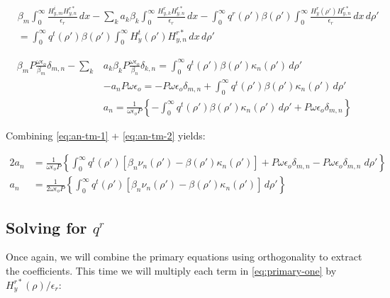 \documentclass[11pt, oneside]{article}   	%
\begin{document}
\begin{align}
&\beta_{m}\int_{0}^{\infty} \frac{H_{y,m}^{i} H_{y,n}^{r*}}{\epsilon_{r}} \, dx
- \sum_{k} a_{k} \beta_{k} \int_{0}^{\infty}  \frac{H_{y,k}^{r} H_{y,n}^{r*}}{\epsilon_{r}}\, dx 
- \int_{0}^{\infty} q^{r} (\rho ') \beta(\rho ')\int_{0}^{\infty} \frac{H_{y}^{r} (\rho ') H_{y,n}^{r*}}{\epsilon_{r}} \, dx \, d\rho ' \nonumber \\
&= \int_{0}^{\infty} q^{t} (\rho ') \beta(\rho ')\int_{0}^{\infty} H_{y}^{t} (\rho ') H_{y,n}^{r*} \, dx \, d\rho '
\end{align}

\begin{align}
\beta_{m} P \frac{\omega \epsilon_{o}}{\beta_{m}}\delta_{m,n} - \sum_{k} &a_{k} \beta_{k} P \frac{\omega \epsilon_{o}}{\beta_{n}}\delta_{k,n}
= \int_{0}^{\infty} q^{t} (\rho ') \beta(\rho ') \kappa_{n}(\rho ') \, d\rho ' \nonumber \\
&-a_{n} P \omega \epsilon_{o}
= -P \omega \epsilon_{o}\delta_{m,n} + \int_{0}^{\infty} q^{t} (\rho ') \beta(\rho ') \kappa_{n}(\rho ') \, d\rho ' \nonumber \\
&a_{n} = \frac{1}{\omega \epsilon_{o} P} \left\{-\int_{0}^{\infty} q^{t} (\rho ') \beta(\rho ')\kappa_{n}(\rho ') \, d\rho ' +P \omega \epsilon_{o}\delta_{m,n} \right\}
\label{eq:an-tm-2}
\end{align}

Combining \eqref{eq:an-tm-1} + \eqref{eq:an-tm-2} yields:

\begin{align}
2 a_{n} &= \frac{1}{\omega \epsilon_{o} P} \left\{\int_{0}^{\infty} q^{t} (\rho ') [\beta_{n}\nu_{n}(\rho ') - \beta(\rho ')\kappa_{n}(\rho ')] +P \omega \epsilon_{o}\delta_{m,n} - P \omega \epsilon_{o}\delta_{m,n} \; d\rho ' \right\} \nonumber \\
a_{n} &= \frac{1}{2 \omega \epsilon_{o} P} \left\{\int_{0}^{\infty} q^{t} (\rho ') [\beta_{n}\nu_{n}(\rho ') - \beta(\rho ')\kappa_{n}(\rho ')] \, d\rho ' \right\}
\end{align}





\subsection{Solving for $q^{r}$}

Once again, we will combine the primary equations using orthogonality to extract the coefficients. This time we will multiply each term in \eqref{eq:primary-one} by $ H_{y}^{r*}(\rho) / \epsilon_{r}$:
\end{document}
